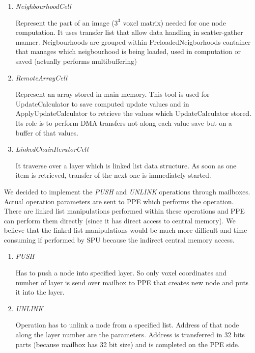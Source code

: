 \begin{enumerate}
\item \emph{NeighbourhoodCell}
\par
Represent the part of an image ($3^3$ voxel matrix) needed for one node computation.
It uses transfer list that allow data handling in scatter-gather manner.
Neigbourhoods are grouped within PreloadedNeigborhoods container that manages which neigbourhood is being loaded, used in computation or saved (actually performs multibuffering)

\item \emph{RemoteArrayCell}
\par
Represent an array stored in main memory.
This tool is used for UpdateCalculator to save computed update values and in ApplyUpdateCalculator to retrieve the values which UpdateCalculator stored.
Its role is to perform DMA transfers not along each value save but on a buffer of that values.

\item \emph{LinkedChainIteratorCell}
\par
It traverse over a layer which is linked list data structure.
As soon as one item is retrieved, transfer of the next one is immediately started.
\end{enumerate}

\par
We decided to implement the \emph{PUSH} and \emph{UNLINK} operations through mailboxes.
Actual operation parameters are sent to PPE which performs the operation.
There are linked list manipulations performed within these operations and PPE can perform them directly (since it has direct access to central memory).
We believe that the linked list manipulations would be much more difficult and time consuming if performed by SPU because the indirect central memory access.

\begin{enumerate}
\item \emph{PUSH}
\par
Has to push a node into specified layer.
So only voxel coordinates and number of layer is send over mailbox to PPE that creates new node and puts it into the layer.

\item \emph{UNLINK}
\par
Operation has to unlink a node from a specified list.
Address of that node along the layer number are the parameters.
Address is transferred in 32 bits parts (because mailbox has 32 bit size) and is completed on the PPE side.
\end{enumerate}

